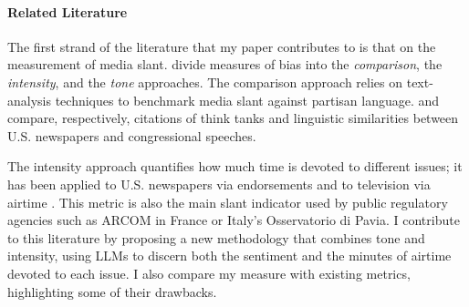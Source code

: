 \documentclass[12pt]{article}
\begin{document}

\paragraph{Related Literature}



The first strand of the literature that my paper contributes to is that on the measurement of media slant. \citet{puglisi_review} divide measures of bias into the \textit{comparison}, the \textit{intensity}, and the \textit{tone} approaches.  The comparison approach relies on text-analysis techniques to benchmark media slant against partisan language. \citet{milyo_measure} and \citet{gentzkow2010media} compare, respectively, citations of think tanks and linguistic similarities between U.S. newspapers and congressional speeches.


The intensity approach quantifies how much time is devoted to different issues; it has been applied to U.S. newspapers via endorsements \citep{ChiangKnight2011} and to television via airtime \citep{durante2012partisan,CageHengelHerveUrvoy2022}.
This metric is also the main slant indicator used by public regulatory agencies such as ARCOM in France or Italy's Osservatorio di Pavia.  I contribute to this literature by proposing a new methodology that combines tone and intensity, using LLMs to discern both the sentiment and the minutes of airtime devoted to each issue. I also compare my measure with existing metrics, highlighting some of their drawbacks.

\end{document}
